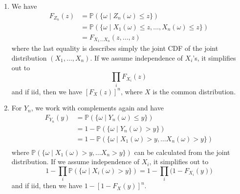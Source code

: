 \documentclass{article}
\begin{document}
      \begin{enumerate}
        \item We have 
        \begin{align*}
          F_{Z_n} (z) & = \mathbb{P}(\{ \omega \mid Z_n (\omega) \leq z \}) \\
          & = \mathbb{P}(\{ \omega \mid X_1 (\omega) \leq z, \ldots, X_n (\omega) \leq z\}) \\
          & = F_{X_1 \ldots X_n} (z, \ldots, z)
        \end{align*}
        where the last equality is describes simply the joint CDF of the joint distribution $(X_1, \ldots, X_n)$. If we assume independence of $X_i$'s, it simplifies out to 
        \begin{equation}
          \prod_{i} F_{X_i} (z)
        \end{equation}
        and if iid, then we have $[F_{X} (z) ]^n$, where $X$ is the common distribution. 
        \item For $Y_n$, we work with complements again and have 
        \begin{align*}
          F_{Y_n} (y) & = \mathbb{P}(\{ \omega \mid Y_n (\omega) \leq y \}) \\ 
          & = 1 - \mathbb{P}(\{ \omega \mid Y_n (\omega) > y \}) \\
          & = 1 - \mathbb{P}(\{ \omega \mid X_1 (\omega) > y, \ldots X_n (\omega) > y \}) \\
        \end{align*}
        where $\mathbb{P}(\{ \omega \mid X_1 (\omega) > y, \ldots X_n > y \})$ can be calculated from the joint distribution. If we assume independence of $X_i$, it simplifies out to 
        \begin{equation}
          1 - \prod_{i} \mathbb{P}(\{\omega \mid X_i(\omega) > y \}) = 1 - \prod_{i} \big( 1 - F_{X_i} (y) \big)
        \end{equation}
        and if iid, then we have $1 - [1 - F_{X} (y)]^n$. 
      \end{enumerate}
\end{document}
